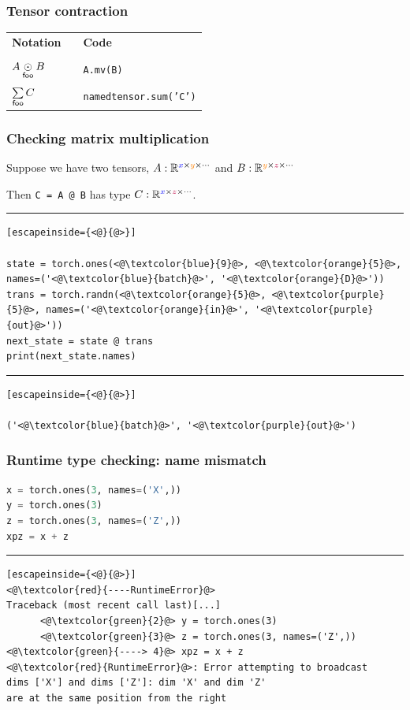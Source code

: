 \documentclass{beamer}
\begin{document}
    \begin{frame}
        \frametitle{Tensor contraction}
        \begin{table}[H]
            \begin{tabular}{lll}
                \textbf{Notation} & & \textbf{Code}                 \\\\
                $A \mathbin{\underset{\mathsf{foo}}{\odot}} B$ & & \texttt{A.mv(B)} \\

                $\sum\limits_{\mathsf{foo}} C$ & & \texttt{namedtensor.sum('C')}
            \end{tabular}
        \end{table}
    \end{frame}

    \begin{frame}[fragile]
        \frametitle{Checking matrix multiplication}

        Suppose we have two tensors, $A: \mathbb{R}^{\textcolor{blue}{x}\times \textcolor{orange}{y} \times \cdots}$ and $B: \mathbb{R}^{\textcolor{orange}{y}\times \textcolor{purple}{z} \times \cdots}$

        Then \texttt{C = A @ B} has type $C: \mathbb{R}^{\textcolor{blue}{x}\times \textcolor{purple}{z} \times \cdots}$.

        \noindent\rule{\textwidth}{0.5pt}

        \begin{lstlisting}[escapeinside={<@}{@>}]

state = torch.ones(<@\textcolor{blue}{9}@>, <@\textcolor{orange}{5}@>, names=('<@\textcolor{blue}{batch}@>', '<@\textcolor{orange}{D}@>'))
trans = torch.randn(<@\textcolor{orange}{5}@>, <@\textcolor{purple}{5}@>, names=('<@\textcolor{orange}{in}@>', '<@\textcolor{purple}{out}@>'))
next_state = state @ trans
print(next_state.names)
        \end{lstlisting}
        \noindent\rule{\textwidth}{0.5pt}
        \begin{lstlisting}[escapeinside={<@}{@>}]

('<@\textcolor{blue}{batch}@>', '<@\textcolor{purple}{out}@>')
        \end{lstlisting}
    \end{frame}

    \begin{frame}[fragile]
        \frametitle{Runtime type checking: name mismatch}
        \begin{lstlisting}[language=Python]
x = torch.ones(3, names=('X',))
y = torch.ones(3)
z = torch.ones(3, names=('Z',))
xpz = x + z
        \end{lstlisting}
        \noindent\rule{\textwidth}{0.5pt}
        \begin{lstlisting}[escapeinside={<@}{@>}]
<@\textcolor{red}{----RuntimeError}@>
Traceback (most recent call last)[...]
      <@\textcolor{green}{2}@> y = torch.ones(3)
      <@\textcolor{green}{3}@> z = torch.ones(3, names=('Z',))
<@\textcolor{green}{----> 4}@> xpz = x + z
<@\textcolor{red}{RuntimeError}@>: Error attempting to broadcast
dims ['X'] and dims ['Z']: dim 'X' and dim 'Z'
are at the same position from the right
        \end{lstlisting}
    \end{frame}
\end{document}
